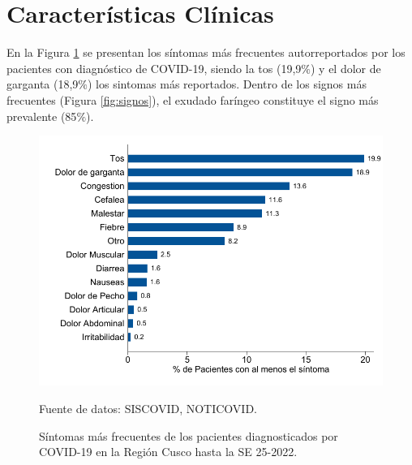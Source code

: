 \documentclass[12pt,a4paper,openany]{book}
\begin{document}
	
	
	\cleardoublepage
	
	
	\clearpage

	
	\section*{Características Clínicas}
	\noindent En la Figura \ref{fig:sintomas} se presentan los síntomas más frecuentes autorreportados por los pacientes con diagnóstico de COVID-19, siendo la tos (19,9$\%$) y el dolor de garganta (18,9$\%$) los sintomas más reportados. Dentro de los signos más frecuentes (Figura \ref{fig:signos}), el exudado faríngeo constituye el signo más prevalente (85$\%$). 
	  
	 
	
	\begin{figure}[h]
		\caption{Síntomas más frecuentes de los pacientes diagnosticados por COVID-19 en la Región Cusco hasta la SE 25-2022.  }\label{fig:sintomas}
		\begin{center}
			\includegraphics[width=0.85\linewidth]{../figuras/figura_sintoma.pdf}
		\end{center}
		{\footnotesize {Fuente de datos: SISCOVID, NOTICOVID.}}
	\end{figure}
	
\end{document}
